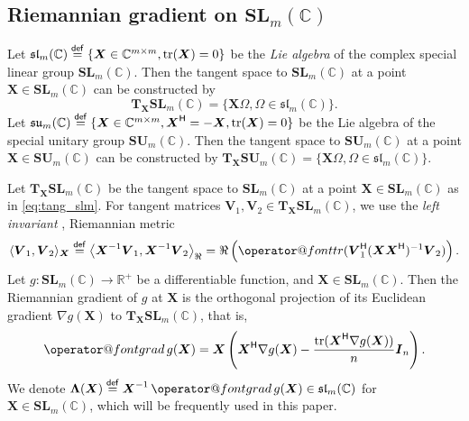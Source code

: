 \documentclass[final,onefignum,onetabnum]{siamart190516}
\makeatletter
\newcommand{\matr}[1]{\boldsymbol{#1}}
\renewcommand{\H}{{\sf H}} %
\newcommand{\trace}[1]{\mathop{\operator@font tr}(#1)}
\newcommand{\ProjGrad}[2]{\mathop{{\operator@font grad} }#1(#2)}
\newcommand{\eqdef}{\stackrel{\sf def}{=}}
\newcommand{\RR}{\mathbb{R}}
\newcommand{\CC}{\mathbb{C}}
\newcommand{\RInner}[2]{\left\langle #1, #2\right\rangle_{\Re}} %
\renewcommand{\H}{{\sf H}}      %
\newcommand{\SUNN}[1]{\mathbf{SU}_{#1}}
\newcommand{\SL}{\mathbf{SL}}
\newcommand{\tr}{\mbox{tr}}
\newcommand{\sll}{\mathfrak{sl}}
\newcommand{\su}{\mathfrak{su}}
\makeatother
\begin{document}
\subsection{Riemannian gradient on $\SL_{m}(\CC)$}
\label{subsec:grad_SL_n}
Let $\sll_{m}(\CC)\eqdef\{\matr{X}\in\CC^{m\times m}, \tr(\matr{X})=0\}$ be the \emph{Lie algebra} \cite{baker2012matrix} of the complex special linear group $\SL_{m}(\CC)$. 
Then the tangent space to $\SL_{m}(\CC)$ at a point $\matr{X}\in\SL_{m}(\CC)$ can be constructed \cite[Eq. (3.7),(3.8)]{baker2012matrix} by 
\begin{equation}\label{eq:tang_slm}
\mathbf{T}_{\matr{X}}\SL_{m}(\CC) = \{\matr{X}\Omega, \Omega\in\sll_{m}(\CC)\}.
\end{equation} 
Let
$\su_{m}(\CC)\eqdef\{\matr{X}\in\CC^{m\times m}, \matr{X}^{\H} = -\matr{X}, \tr(\matr{X})=0\}$ be the Lie algebra of the special unitary group $\SUNN{m}(\CC)$.  
Then the tangent space to $\SUNN{m}(\CC)$ at a point $\matr{X}\in\SUNN{m}(\CC)$ can be constructed \cite[Eq. (3.15)]{baker2012matrix} by 
$\mathbf{T}_{\matr{X}}\SUNN{m}(\CC) = \{\matr{X}\Omega, \Omega\in\sll_{m}(\CC)\}.$

Let $\mathbf{T}_{\matr{X}}\SL_{m}(\CC)$ be the tangent space to $\SL_{m}(\CC)$ at a point $\matr{X}\in\SL_{m}(\CC)$ as in \cref{eq:tang_slm}. 
For tangent matrices $\matr{V}_1, \matr{V}_2\in\mathbf{T}_{\matr{X}}\SL_{m}(\CC)$,
we use the \emph{left invariant}  \cite{absil2009optimization}, \cite[Eq. (6.2)]{afsari2004gradient}  Riemannian metric  
\begin{equation*}
\langle\matr{V}_1, \matr{V}_2\rangle_{\matr{X}} 
\eqdef \RInner{\matr{X}^{-1}\matr{V}_1}{\matr{X}^{-1}\matr{V}_2}
= \Re \left({\trace{\matr{V}_1^{\H}(\matr{X}\matr{X}^{\H})^{-1}\matr{V}_2}}\right). 
\end{equation*}
Let
$\textit{g}: \SL_{m}(\CC) \longrightarrow \RR^{+}$  
be a differentiable function, and $\matr{X}\in\SL_{m}(\CC)$. 
Then the Riemannian gradient of $g$ at $\matr{X}$ is the orthogonal projection \cite[Lemma 6.2]{afsari2004gradient} of its Euclidean gradient $\nabla g(\matr{X})$ to $\mathbf{T}_{\matr{X}}\SL_{m}(\CC)$, that is,
\begin{align}\label{eq:riema_gradient_c}
\ProjGrad{g}{\matr{X}} = \matr{X}\left(\matr{X}^{\H}\nabla g(\matr{X}) - \frac{\tr(\matr{X}^{\H}\nabla g(\matr{X}))}{n}\matr{I}_n\right).
\end{align}
We denote $\matr{\Lambda}(\matr{X})\eqdef\matr{X}^{-1}\ProjGrad{g}{\matr{X}}\in\sll_{m}(\CC)$ for $\matr{X}\in\SL_{m}(\CC)$, which will be frequently used in this paper. 
\end{document}
